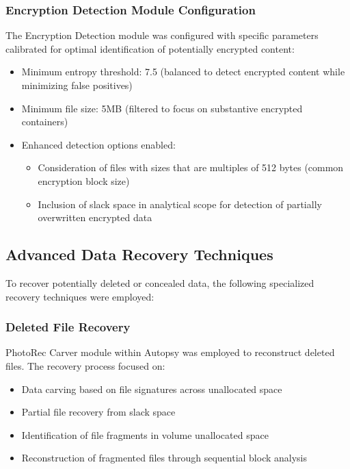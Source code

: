 \subsubsection{Encryption Detection Module Configuration}
The Encryption Detection module was configured with specific parameters calibrated for optimal identification of potentially encrypted content:
\begin{itemize}
    \item Minimum entropy threshold: 7.5 (balanced to detect encrypted content while minimizing false positives)
    \item Minimum file size: 5MB (filtered to focus on substantive encrypted containers)
    \item Enhanced detection options enabled:
    \begin{itemize}
        \item Consideration of files with sizes that are multiples of 512 bytes (common encryption block size)
        \item Inclusion of slack space in analytical scope for detection of partially overwritten encrypted data
    \end{itemize}
\end{itemize}

\subsection{Advanced Data Recovery Techniques}
To recover potentially deleted or concealed data, the following specialized recovery techniques were employed:

\subsubsection{Deleted File Recovery}
PhotoRec Carver module within Autopsy was employed to reconstruct deleted files. The recovery process focused on:
\begin{itemize}
    \item Data carving based on file signatures across unallocated space
    \item Partial file recovery from slack space
    \item Identification of file fragments in volume unallocated space
    \item Reconstruction of fragmented files through sequential block analysis
\end{itemize}

